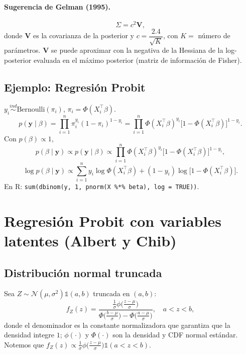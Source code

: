 \documentclass[11pt]{article}
\newcommand{\N}{\mathcal{N}}
\newcommand{\ind}{\mathbb{1}}
\newcommand{\by}{\mathbf{y}}
\newcommand{\bV}{\mathbf{V}}
\theoremstyle{definition}
\begin{document}
\paragraph{Sugerencia de Gelman (1995).}
\[
\Sigma=c^2\bV,
\]
donde $\bV$ es la covarianza de la posterior y $c=\dfrac{2.4}{\sqrt{K}}$, con $K=$ número de parámetros. $\bV$ se puede aproximar con la negativa de la Hessiana de la log-posterior evaluada en el máximo posterior (matriz de información de Fisher).

\subsection{Ejemplo: Regresión Probit}
$y_i\overset{ind}{\sim}\text{Bernoulli}(\pi_i)$, $\pi_i=\Phi(X_i^{\top}\beta)$.
\[
p(\by\mid\beta)=\prod_{i=1}^n\pi_i^{y_i}(1-\pi_i)^{1-y_i}=\prod_{i=1}^n\Phi(X_i^{\top}\beta)^{y_i}\big[1-\Phi(X_i^{\top}\beta)\big]^{1-y_i}.
\]
Con $p(\beta)\propto 1$,
\[
p(\beta\mid\by)\propto p(\by\mid\beta)\propto\prod_{i=1}^n\Phi(X_i^{\top}\beta)^{y_i}\big[1-\Phi(X_i^{\top}\beta)\big]^{1-y_i},
\]
\[
\log p(\beta\mid\by)\propto\sum_{i=1}^n y_i\log\Phi(X_i^{\top}\beta)+(1-y_i)\log\big[1-\Phi(X_i^{\top}\beta)\big].
\]
En R: \verb|sum(dbinom(y, 1, pnorm(X %*% beta), log = TRUE))|.

\section{Regresión Probit con variables latentes (Albert y Chib)}
\subsection{Distribución normal truncada}
Sea $Z\sim\N(\mu,\sigma^2)\ind(a,b)$ truncada en $(a,b)$:
\[
f_Z(z)=\frac{\tfrac{1}{\sigma}\phi\!\big(\tfrac{z-\mu}{\sigma}\big)}{\Phi\!\big(\tfrac{b-\mu}{\sigma}\big)-\Phi\!\big(\tfrac{a-\mu}{\sigma}\big)},\quad a<z<b,
\]
donde el denominador es la constante normalizadora que garantiza que la densidad integre $1$; $\phi(\cdot)$ y $\Phi(\cdot)$ son la densidad y CDF normal estándar. Notemos que $f_Z(z)\propto\tfrac{1}{\sigma}\phi\!\big(\tfrac{z-\mu}{\sigma}\big)\ind(a<z<b)$.
\end{document}
